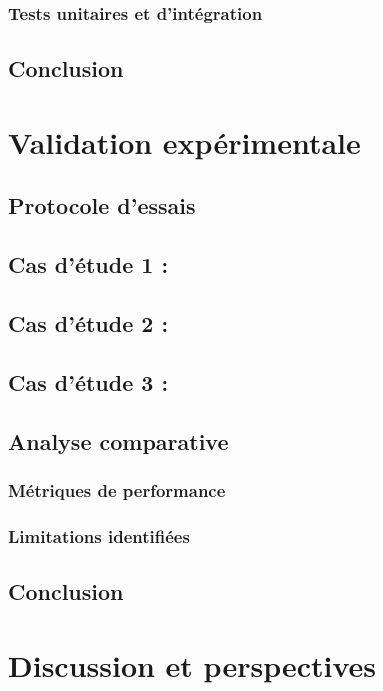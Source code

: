 \documentclass[a4paper,12pt]{article}
\begin{document}
\subsubsection{Tests unitaires et d'intégration}
\label{sec:org2f42814}
\subsection{Conclusion}
\label{sec:orgb14e390}
\clearpage
\section{Validation expérimentale}
\label{sec:orgf62d2b0}
\subsection{Protocole d'essais}
\label{sec:org8aad2ce}

\subsection{Cas d'étude 1 :}
\label{sec:org42f7066}
\subsection{Cas d'étude 2 :}
\label{sec:orgd12366b}
\subsection{Cas d'étude 3 :}
\label{sec:orga253282}

\subsection{Analyse comparative}
\label{sec:org153bd39}
\subsubsection{Métriques de performance}
\label{sec:org61b787f}
\subsubsection{Limitations identifiées}
\label{sec:org3676a1d}
\subsection{Conclusion}
\label{sec:orgf8c3c69}
\clearpage
\section{Discussion et perspectives}
\label{sec:orge6b871b}
\end{document}
